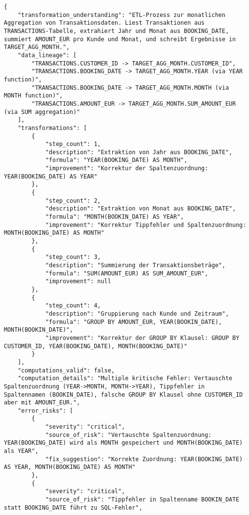 \begin{lstlisting}[caption={Ausgabe: Claude Sonnet 4 Anwendungsfall 1 Konsistenzdurchlauf},label={claude_case1_prompt2}]
{
    "transformation_understanding": "ETL-Prozess zur monatlichen Aggregation von Transaktionsdaten. Liest Transaktionen aus TRANSACTIONS-Tabelle, extrahiert Jahr und Monat aus BOOKING_DATE, summiert AMOUNT_EUR pro Kunde und Monat, und schreibt Ergebnisse in TARGET_AGG_MONTH.",
    "data_lineage": [
        "TRANSACTIONS.CUSTOMER_ID -> TARGET_AGG_MONTH.CUSTOMER_ID",
        "TRANSACTIONS.BOOKING_DATE -> TARGET_AGG_MONTH.YEAR (via YEAR function)",
        "TRANSACTIONS.BOOKING_DATE -> TARGET_AGG_MONTH.MONTH (via MONTH function)",
        "TRANSACTIONS.AMOUNT_EUR -> TARGET_AGG_MONTH.SUM_AMOUNT_EUR (via SUM aggregation)"
    ],
    "transformations": [
        {
            "step_count": 1,
            "description": "Extraktion von Jahr aus BOOKING_DATE",
            "formula": "YEAR(BOOKING_DATE) AS MONTH",
            "improvement": "Korrektur der Spaltenzuordnung: YEAR(BOOKING_DATE) AS YEAR"
        },
        {
            "step_count": 2,
            "description": "Extraktion von Monat aus BOOKING_DATE",
            "formula": "MONTH(BOOKIN_DATE) AS YEAR",
            "improvement": "Korrektur Tippfehler und Spaltenzuordnung: MONTH(BOOKING_DATE) AS MONTH"
        },
        {
            "step_count": 3,
            "description": "Summierung der Transaktionsbeträge",
            "formula": "SUM(AMOUNT_EUR) AS SUM_AMOUNT_EUR",
            "improvement": null
        },
        {
            "step_count": 4,
            "description": "Gruppierung nach Kunde und Zeitraum",
            "formula": "GROUP BY AMOUNT_EUR, YEAR(BOOKIN_DATE), MONTH(BOOKIN_DATE)",
            "improvement": "Korrektur der GROUP BY Klausel: GROUP BY CUSTOMER_ID, YEAR(BOOKING_DATE), MONTH(BOOKING_DATE)"
        }
    ],
    "computations_valid": false,
    "computation_details": "Multiple kritische Fehler: Vertauschte Spaltenzuordnung (YEAR->MONTH, MONTH->YEAR), Tippfehler in Spaltennamen (BOOKIN_DATE), falsche GROUP BY Klausel ohne CUSTOMER_ID aber mit AMOUNT_EUR.",
    "error_risks": [
        {
            "severity": "critical",
            "source_of_risk": "Vertauschte Spaltenzuordnung: YEAR(BOOKING_DATE) wird als MONTH gespeichert und MONTH(BOOKING_DATE) als YEAR",
            "fix_suggestion": "Korrekte Zuordnung: YEAR(BOOKING_DATE) AS YEAR, MONTH(BOOKING_DATE) AS MONTH"
        },
        {
            "severity": "critical",
            "source_of_risk": "Tippfehler in Spaltenname BOOKIN_DATE statt BOOKING_DATE führt zu SQL-Fehler",

\end{lstlisting}
